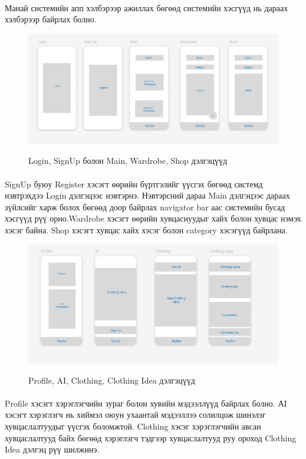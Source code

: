 \paragraph{} Манай системийн апп хэлбэрээр ажиллах бөгөөд системийн хэсгүүд нь дараах хэлбэрээр байрлах болно.
\begin{figure}[H]
    \centering
    \caption{Login, SignUp болон Main, Wardrobe, Shop дэлгэцүүд }
    \includegraphics[width=\textwidth]{figures/Capture1.PNG}
    \label{}
\end{figure}
\paragraph{} SignUp буюу Register хэсэгт өөрийн бүртгэлийг үүсгэх бөгөөд системд нэвтрэхдээ Login дэлгэцээс нэвтэрнэ. Нэвтэрсний дараа Main дэлгэцээс дараах зүйлсийг харж болох бөгөөд доор байрлах navigator bar аас системийн бусад хэсгүүд рүү орно.Wardrobe хэсэгт өөрийн хувцаснуудыг хайх болон хувцас нэмэх хэсэг байна. Shop хэсэгт хувцас хайх хэсэг болон category хэсэгүүд байрлана.
\begin{figure}[H]
    \centering
    \caption{Profile, AI, Clothing, Clothing Idea дэлгэцүүд }
    \includegraphics[width=\textwidth]{figures/Capture2.PNG}
    \label{}
\end{figure}
\paragraph{} Profile хэсэгт хэрэглэгчийн зураг болон хувийн мэдээллүүд байрлах болно. АI хэсэгт хэрэглэгч нь хиймэл оюун ухаантай мэдээллээ солилцож шинэлэг хувцаслалтуудыг үүсгэх боломжтой. Clothing хэсэг хэрэглэгчийн авсан хувцаслалтууд байх бөгөөд хэрэглэгч тэдгээр хувцаслалтууд руу ороход Clothing Idea дэлгэц рүү шилжинэ.


